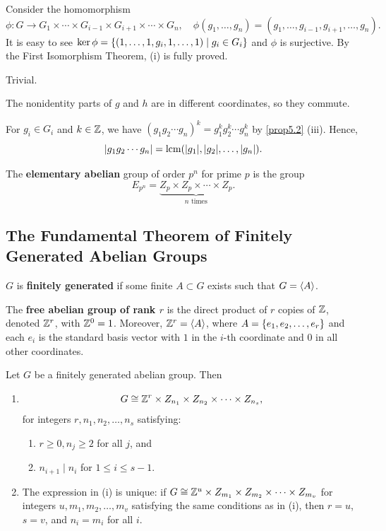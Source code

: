 \begin{proofnum}
    \item Consider the homomorphism 
    \[\phi : G \to G_1 \times \cdots \times G_{i - 1} \times G_{i + 1} \times \cdots \times G_n, \quad \phi(g_1, \ldots, g_n) = (g_1, \ldots, g_{i - 1}, g_{i + 1}, \ldots, g_n).\] 
    It is easy to see $\ker\phi = \{(1, \ldots, 1, g_i, 1, \ldots, 1) \mid g_i \in G_i\}$ and $\phi$ is surjective. By the First Isomorphism Theorem, (i) is fully proved.
    \item Trivial.
    \item The nonidentity parts of $g$ and $h$ are in different coordinates, so they commute.
\end{proofnum}

\note For $g_i \in G_i$ and $k \in \mathbb Z$, we have $(g_1g_2\cdots g_n)^k = g_1^kg_2^k \cdots g_n^k$ by \autoref{prop5.2} (iii). Hence,
\[|g_1g_2\cdots g_n| = \operatorname{lcm}(|g_1|, |g_2|, \ldots, |g_n|).\]

 The \textbf{elementary abelian} group of order $p^n$ for prime $p$ is the group
\[E_{p^n} = \underbrace{Z_p \times Z_p \times \cdots \times Z_p}_{n \text{ times}}.\]

\subsection{The Fundamental Theorem of Finitely Generated Abelian Groups}

 $G$ is \textbf{finitely generated} if some finite $A \subset G$ exists such that $G = \langle A\rangle$.

 The \textbf{free abelian group of rank $r$} is the direct product of $r$ copies of $\mathbb Z$, denoted $\mathbb Z^r$, with $\mathbb Z^0 = 1$. Moreover, $\mathbb Z^r = \langle A\rangle$, where $A = \{e_1, e_2, \ldots, e_r\}$ and each $e_i$ is the standard basis vector with $1$ in the $i$-th coordinate and $0$ in all other coordinates.

 \label{theo5.3}
Let $G$ be a finitely generated abelian group. Then
\begin{enumerate}
    \item 
    \[G \cong \mathbb Z^r \times Z_{n_1} \times Z_{n_2} \times \cdots \times Z_{n_s},\]
    for integers $r, n_1, n_2, \ldots, n_s$ satisfying:
    \begin{enumerate}
        \item $r \geq 0, n_j \geq 2$ for all $j$, and
        \item $n_{i + 1} \mid n_i$ for $1 \leq i \leq s - 1$.
    \end{enumerate}
    \item The expression in (i) is unique: if $G \cong \mathbb Z^u \times Z_{m_1} \times Z_{m_2} \times \cdots \times Z_{m_v}$ for integers $u, m_1, m_2, \ldots, m_v$ satisfying the same conditions as in (i), then $r = u$, $s = v$, and $n_i = m_i$ for all $i$.
\end{enumerate}


